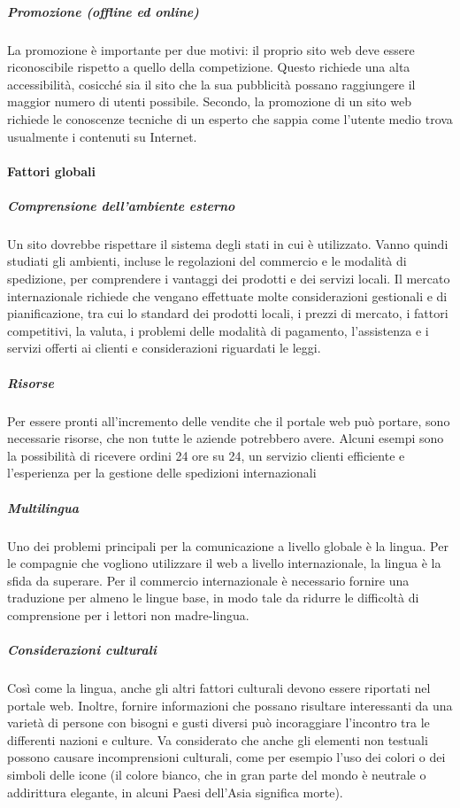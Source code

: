 \subparagraph{Promozione (offline ed online)}
La promozione è importante per due motivi: il proprio sito web deve essere riconoscibile rispetto a quello della competizione. Questo richiede una alta accessibilità, cosicché sia il sito che la sua pubblicità possano raggiungere il maggior numero di utenti possibile. Secondo, la promozione di un sito web  richiede le conoscenze tecniche di un esperto che sappia come l'utente medio trova usualmente i contenuti su Internet.

\paragraph{Fattori globali}
\subparagraph{Comprensione dell'ambiente esterno}
Un sito dovrebbe rispettare il sistema degli stati in cui è utilizzato. Vanno quindi studiati gli ambienti, incluse le regolazioni del commercio e le modalità di spedizione, per comprendere i vantaggi dei prodotti e dei servizi locali. Il mercato internazionale richiede che vengano effettuate molte considerazioni gestionali e di pianificazione, tra cui lo standard dei prodotti locali, i prezzi di mercato, i fattori competitivi, la valuta, i problemi delle modalità di pagamento, l'assistenza e i servizi offerti ai clienti e considerazioni riguardati le leggi.

\subparagraph{Risorse}
Per essere pronti all'incremento delle vendite che il portale web può portare, sono necessarie risorse, che non tutte le aziende potrebbero avere. Alcuni esempi sono la possibilità di ricevere ordini 24 ore su 24, un servizio clienti efficiente e l'esperienza per la gestione delle spedizioni internazionali

\subparagraph{Multilingua}
Uno dei problemi principali per la comunicazione a livello globale è la lingua. Per le compagnie che vogliono utilizzare il web a livello internazionale, la lingua è la sfida da superare. Per il commercio internazionale è necessario fornire una traduzione per almeno le lingue base, in modo tale da ridurre le difficoltà di comprensione per i lettori non madre-lingua.

\subparagraph{Considerazioni culturali}
Così come la lingua, anche gli altri fattori culturali devono essere riportati nel portale web. Inoltre, fornire informazioni che possano risultare interessanti da una varietà di persone con bisogni e gusti diversi può incoraggiare l'incontro tra le differenti nazioni e culture. Va considerato che anche gli elementi non testuali possono causare incomprensioni culturali, come per esempio l'uso dei colori o dei simboli delle icone (il colore bianco, che in gran parte del mondo è neutrale o addirittura elegante, in alcuni Paesi dell'Asia significa morte).

